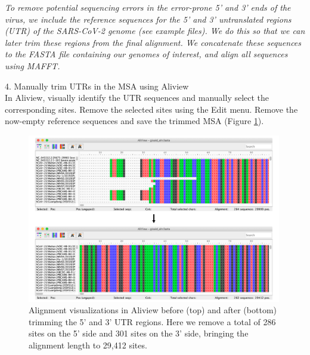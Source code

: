 \documentclass{article}
\newcommand{\ann}[1]{
\begin{adjustwidth}{0.5cm}{}
\it{#1}\\
\end{adjustwidth}}
\begin{document}
\ann{To remove potential sequencing errors in the error-prone 5' and 3' ends of the virus, we include the reference sequences for the 5' and 3' untranslated regions (UTR) of the SARS-CoV-2 genome (see example files).
We do this so that we can later trim these regions from the final alignment.
We concatenate these sequences to the FASTA file containing our genomes of interest, and align all sequences using MAFFT.} %

4. Manually trim UTRs in the MSA using Aliview\\

In Aliview, visually identify the UTR sequences and manually select the corresponding sites. Remove the selected sites using the Edit menu. %
Remove the now-empty reference sequences and save the trimmed MSA (Figure \ref{fig:aliview}).\\ %

\begin{figure}[!ht]
    \centering
    \includegraphics[width=0.99\textwidth]{figs/aliview.pdf}
    \caption{Alignment visualizations in Aliview before (top) and after (bottom) trimming the 5' and 3' UTR regions. Here we remove a total of 286 sites on the 5' side and 301 sites on the 3' side, bringing the alignment length to 29,412 sites.}
    \label{fig:aliview}
\end{figure}
\end{document}
